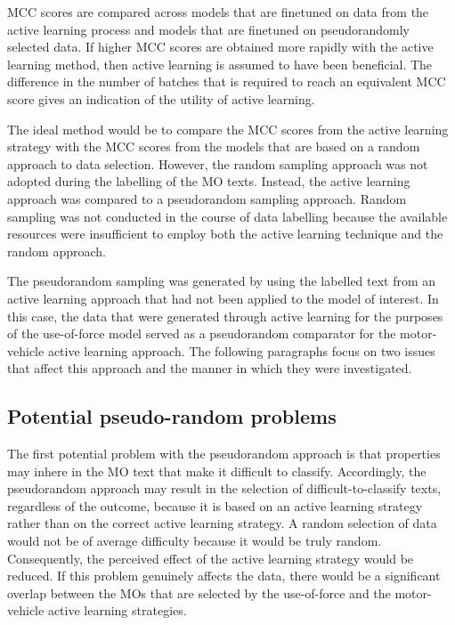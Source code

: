 MCC scores are compared across models that are finetuned on data from the active learning process and models that are finetuned on pseudorandomly selected data. If higher MCC scores are obtained more rapidly with the active learning method, then active learning is assumed to have been beneficial. The difference in the number of batches that is required to reach an equivalent MCC score gives an indication of the utility of active learning.

The ideal method would be to compare the MCC scores from the active learning strategy with the MCC scores from the models that are based on a random approach to data selection. However, the random sampling approach was not adopted during the labelling of the MO texts. Instead, the active learning approach was compared to a pseudorandom sampling approach. Random sampling was not conducted in the course of data labelling because the available resources were insufficient to employ both the active learning technique and the random approach.

The pseudorandom sampling was generated by using the labelled text from an active learning approach that had not been applied to the model of interest. In this case, the data that were generated through active learning for the purposes of the use-of-force model served as a pseudorandom comparator for the motor-vehicle active learning approach. The following paragraphs focus on two issues that affect this approach and the manner in which they were investigated. 

\subsection{Potential pseudo-random problems}
The first potential problem with the pseudorandom approach is that properties may inhere in the MO text that make it difficult to classify. Accordingly, the pseudorandom approach may result in the selection of difficult-to-classify texts, regardless of the outcome, because it is based on an active learning strategy rather than on the correct active learning strategy. A random selection of data would not be of average difficulty because it would be truly random. Consequently, the perceived effect of the active learning strategy would be reduced. If this problem genuinely affects the data, there would be a significant overlap between the MOs that are selected by the use-of-force and the motor-vehicle active learning strategies.

